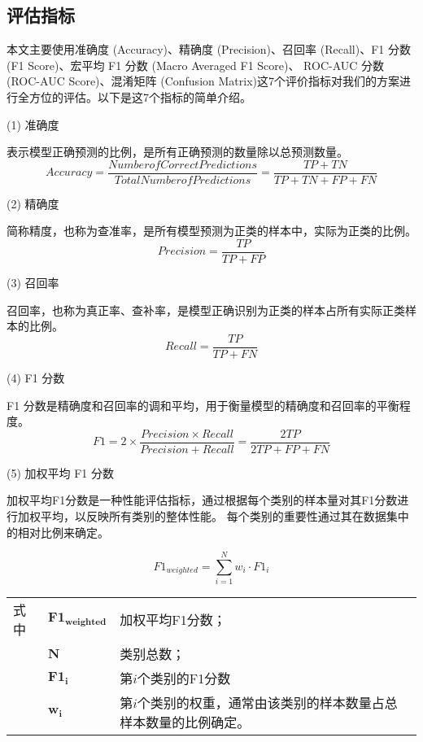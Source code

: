 \subsection{评估指标}
本文主要使用准确度 (Accuracy)、精确度 (Precision)、召回率 (Recall)、F1 分数 (F1 Score)、宏平均 F1 分数 (Macro Averaged F1 Score)、
ROC-AUC 分数 (ROC-AUC Score)、混淆矩阵 (Confusion Matrix)这7个评价指标对我们的方案进行全方位的评估。以下是这7个指标的简单介绍。\par
(1) 准确度\par
表示模型正确预测的比例，是所有正确预测的数量除以总预测数量。
\begin{equation}
  \label{eq:val_score1}
  Accuracy = \frac{Number of Correct Predictions}{Total Number of Predictions} = \frac{TP + TN}{TP + TN + FP + FN}
\end{equation}

(2) 精确度\par
简称精度，也称为查准率，是所有模型预测为正类的样本中，实际为正类的比例。
\begin{equation}
  \label{eq:val_score2}
  Precision = \frac{TP}{TP + FP}
\end{equation}

(3) 召回率\par
召回率，也称为真正率、查补率，是模型正确识别为正类的样本占所有实际正类样本的比例。
\begin{equation}
  \label{eq:val_score3} 
  Recall = \frac{TP}{TP + FN}
\end{equation}

(4) F1 分数\par
F1 分数是精确度和召回率的调和平均，用于衡量模型的精确度和召回率的平衡程度。
\begin{equation}
  \label{eq:val_score4}
  F1 = 2 \times \frac{Precision \times Recall}{Precision + Recall} = \frac{2TP}{2TP + FP + FN}
\end{equation}

(5) 加权平均 F1 分数\par
加权平均F1分数是一种性能评估指标，通过根据每个类别的样本量对其F1分数进行加权平均，以反映所有类别的整体性能。
每个类别的重要性通过其在数据集中的相对比例来确定。

\begin{equation}
  \label{eq:val_score5}
  F1_{weighted} = \sum\limits_{i=1}^{N} w_i \cdot F1_i
\end{equation}
\begin{flushleft}
  \renewcommand\arraystretch{1.25}
  \begin{tabularx}{\textwidth}{@{}>{\normalsize\rm}l@{\quad}>{\normalsize\rm}l@{——}>{\normalsize\rm}X@{}}
  式中& $\symbf{F1_{weighted}}$ &加权平均F1分数；\\
  &  $\symbf{N}$&类别总数；\\
  &  $\symbf{F1_i}$ &第$i$个类别的F1分数\\
  &  $\symbf{w_i}$ & 第$i$个类别的权重，通常由该类别的样本数量占总样本数量的比例确定。\\
  \end{tabularx}\vspace{.5ex}%
  \end{flushleft}


